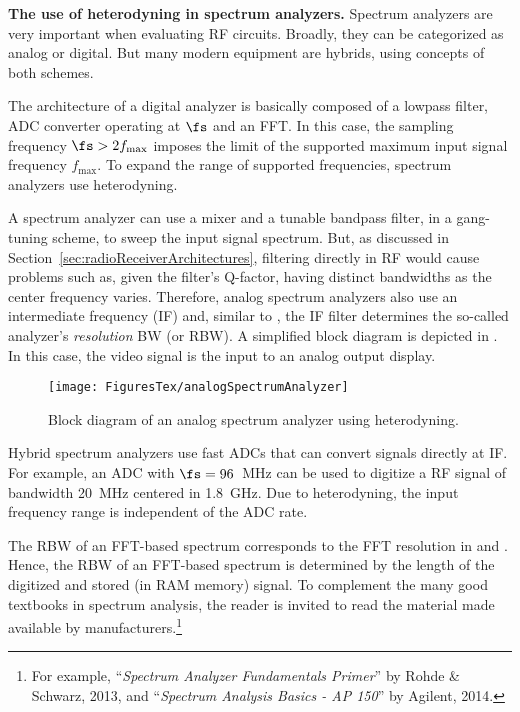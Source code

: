 \bApplication \textbf{The use of heterodyning in spectrum analyzers.}
Spectrum analyzers are very important when evaluating RF circuits.
Broadly, they can be categorized as analog or digital. But many modern
equipment are hybrids, using concepts of both schemes.

The architecture of a digital analyzer is basically composed of a lowpass filter, ADC converter
operating at $\fs$ and an FFT. In this case, the sampling frequency $\fs > 2 f_{\textrm{max}}$
imposes the limit of the supported maximum input signal frequency $f_{\textrm{max}}$.
To expand the range of supported frequencies, spectrum analyzers use heterodyning.

A spectrum analyzer can use a mixer and a tunable bandpass filter, in a gang-tuning scheme, to sweep the input signal spectrum. But, as discussed in Section~\ref{sec:radioReceiverArchitectures}, filtering directly in RF would cause problems such as, given the filter's Q-factor, having distinct bandwidths as the center frequency varies. Therefore, analog spectrum analyzers also use an intermediate frequency (IF) and, similar to , the IF filter determines the so-called analyzer's \emph{resolution} BW (or RBW). A simplified block diagram is depicted in . In this case, the video signal is the input to an analog output display.


\begin{figure}[htbp]
\centering
\texttt{[image: FiguresTex/analogSpectrumAnalyzer]}
\caption{Block diagram of an analog spectrum analyzer using heterodyning.\label{fig:analogSpectrumAnalyzer}}
\end{figure}

Hybrid spectrum analyzers use fast ADCs that can convert signals directly at IF. For example, an ADC with $\fs = 96$~MHz can be used to digitize a RF signal of bandwidth 20~MHz centered in 1.8~GHz. 
Due to heterodyning, the input frequency range is independent of the ADC rate.

The RBW of an FFT-based spectrum corresponds to the FFT resolution in  and .
Hence, the RBW of an FFT-based spectrum is determined by the length of the digitized and stored (in RAM memory) signal. To complement the many good textbooks in spectrum analysis, the reader is invited to read the material made available by manufacturers.\footnote{For example, ``\emph{Spectrum Analyzer
Fundamentals Primer}'' by Rohde \& Schwarz, 2013, and ``\emph{Spectrum Analysis Basics - AP 150}''
by Agilent, 2014.}
\eApplication

